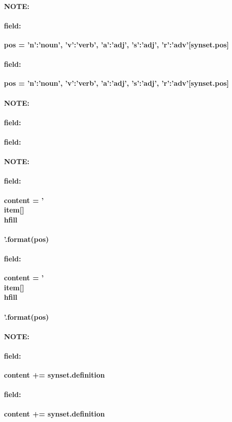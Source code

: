 \documentclass[12pt]{article}
\newenvironment{note}{\paragraph{NOTE:}}{}
\newenvironment{field}{\paragraph{field:}}{}
\begin{document}
\begin{note}
\begin{field}
\textbf{\large pos = {'n':'noun', 'v':'verb', 'a':'adj', 's':'adj', 'r':'adv'}[synset.pos]}
\end{field}
\begin{field}
\textbf{\large pos = {'n':'noun', 'v':'verb', 'a':'adj', 's':'adj', 'r':'adv'}[synset.pos]}
\begin{description}

\end{description}
\end{field}
\end{note}
\begin{note}
\begin{field}
\textbf{\large }
\end{field}
\begin{field}
\textbf{\large }
\begin{description}

\end{description}
\end{field}
\end{note}
\begin{note}
\begin{field}
\textbf{\large content = '\\item[{}] \\hfill \\\\ \n'.format(pos)}
\end{field}
\begin{field}
\textbf{\large content = '\\item[{}] \\hfill \\\\ \n'.format(pos)}
\begin{description}

\end{description}
\end{field}
\end{note}
\begin{note}
\begin{field}
\textbf{\large content += synset.definition}
\end{field}
\begin{field}
\textbf{\large content += synset.definition}
\begin{description}

\end{description}
\end{field}
\end{note}
\end{document}
